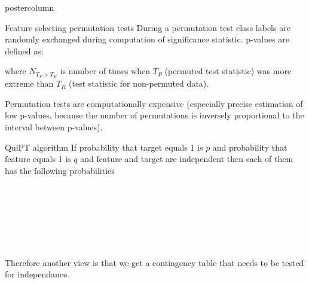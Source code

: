 \documentclass[final]{beamer}\usepackage[]{graphicx}\usepackage[]{color}
\begin{document}
\begin{frame}
\begin{columns}
\begin{column}{.49\textwidth}
\begin{beamercolorbox}[center,wd=\textwidth]{postercolumn}
\begin{minipage}[T]{.95\textwidth}
{\begin{block}{Feature selecting permutation tests}
    During a permutation test class labels are randomly exchanged during computation of significance statistic. p-values are defined as:
    
\begin{center}
\end{center}

where $N_{T_P > T_R}$ is number of times when $T_P$ (permuted test statistic) was more extreme than $T_R$ (test statistic for non-permuted data).

Permutation tests are computationally expensive (especially precise estimation of low p-values, because the number of permutations is inversely proportional to the interval between p-values).
      
    \end{block}
    \vfill
    
    
    \begin{block}{QuiPT algorithm}
      If probability that target equals 1 is $p$ and probability that feature equals
1 is $q$ and feature and target are independent then each of them has the 
following probabilities 

\begin{center}
\scalebox{0.85}{
$P(Target, Feature) = (1,1)) = p \cdot q$
}
\end{center}

\\

\begin{center}
\scalebox{0.85}{
$P(Target, Feature) = (1,0)) = p \cdot (1-q)$
}
\end{center}

\\

\begin{center}
\scalebox{0.85}{
$P(Target, Feature) = (0,1)) = (1-p) \cdot q$
}
\end{center}

\\

\begin{center}
\scalebox{0.85}{
$P(Target, Feature) = (0,0)) = (1-p) \cdot (1-q)$
}
\end{center}

\\

Therefore another view is that we get a contingency table that needs to 
be tested for independance.
  \end{block}
  \vfill
  
}
\end{minipage}
\end{beamercolorbox}
\end{column}
\end{columns}
\end{frame}
\end{document}
